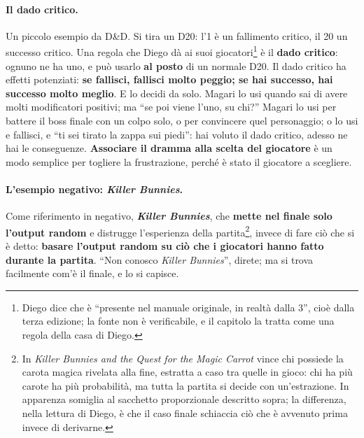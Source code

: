 \paragraph{Il dado critico.} Un piccolo esempio da D\&D. Si tira un D20: l'1 è un fallimento
critico, il 20 un successo critico. Una regola che Diego dà ai suoi giocatori\footnote{Diego
dice che è ``presente nel manuale originale, in realtà dalla 3'', cioè dalla terza edizione;
la fonte non è verificabile, e il capitolo la tratta come una regola della casa di Diego.} è
il \textbf{dado critico}: ognuno ne ha uno, e può usarlo \textbf{al posto} di un normale D20.
Il dado critico ha effetti potenziati: \textbf{se fallisci, fallisci molto peggio; se hai
successo, hai successo molto meglio}. E lo decidi da solo. Magari lo usi quando sai di avere
molti modificatori positivi; ma ``se poi viene l'uno, su chi?'' Magari lo usi per battere il
boss finale con un colpo solo, o per convincere quel personaggio; o lo usi e fallisci, e ``ti
sei tirato la zappa sui piedi'': hai voluto il dado critico, adesso ne hai le conseguenze.
\textbf{Associare il dramma alla scelta del giocatore} è un modo semplice per togliere la
frustrazione, perché è stato il giocatore a scegliere.

\paragraph{L'esempio negativo: \emph{Killer Bunnies}.} Come riferimento in negativo,
\textbf{\emph{Killer Bunnies}}, che \textbf{mette nel finale solo l'output random} e
distrugge l'esperienza della partita\footnote{In \emph{Killer Bunnies and the Quest for the
Magic Carrot} vince chi possiede la carota magica rivelata alla fine, estratta a caso tra
quelle in gioco: chi ha più carote ha più probabilità, ma tutta la partita si decide con
un'estrazione. In apparenza somiglia al sacchetto proporzionale descritto sopra; la differenza, nella
lettura di Diego, è che il caso finale schiaccia ciò che è avvenuto prima invece di
derivarne.},
invece di fare ciò che si è detto: \textbf{basare l'output random su ciò che i giocatori hanno
fatto durante la partita}. ``Non conosco \emph{Killer Bunnies}'', direte; ma si trova
facilmente com'è il finale, e lo si capisce.

